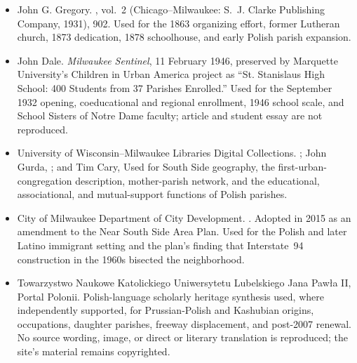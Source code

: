 \begin{itemize}[leftmargin=1.35em,itemsep=0.2em,topsep=0.2em]
\item John G. Gregory. , vol.~2 (Chicago--Milwaukee: S.~J. Clarke Publishing Company, 1931), 902. Used for the 1863 organizing effort, former Lutheran church, 1873 dedication, 1878 schoolhouse, and early Polish parish expansion.
\item John Dale.  \emph{Milwaukee Sentinel}, 11 February 1946, preserved by Marquette University's Children in Urban America project as ``St. Stanislaus High School: 400 Students from 37 Parishes Enrolled.'' Used for the September 1932 opening, coeducational and regional enrollment, 1946 school scale, and School Sisters of Notre Dame faculty; article and student essay are not reproduced.
\item University of Wisconsin--Milwaukee Libraries Digital Collections. ; John Gurda, ; and Tim Cary,  Used for South Side geography, the first-urban-congregation description, mother-parish network, and the educational, associational, and mutual-support functions of Polish parishes.
\item City of Milwaukee Department of City Development. . Adopted in 2015 as an amendment to the Near South Side Area Plan. Used for the Polish and later Latino immigrant setting and the plan's finding that Interstate~94 construction in the 1960s bisected the neighborhood.
\item Towarzystwo Naukowe Katolickiego Uniwersytetu Lubelskiego Jana Pawła II, Portal Polonii.  Polish-language scholarly heritage synthesis used, where independently supported, for Prussian-Polish and Kashubian origins, occupations, daughter parishes, freeway displacement, and post-2007 renewal. No source wording, image, or direct or literary translation is reproduced; the site's material remains copyrighted.

\end{itemize}
